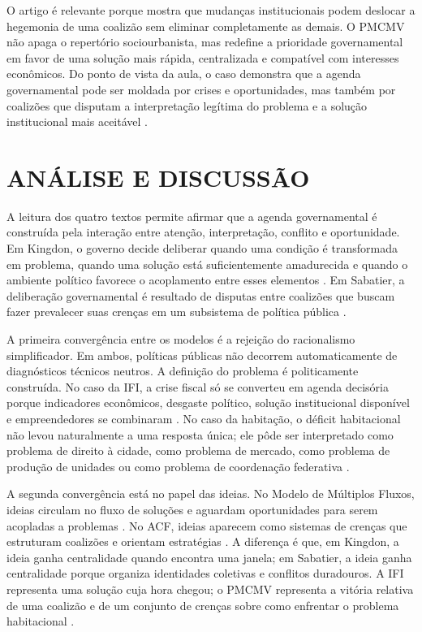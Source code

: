 \documentclass[12pt,a4paper]{article}
\begin{document}
O artigo é relevante porque mostra que mudanças institucionais podem deslocar a hegemonia de uma coalizão sem eliminar completamente as demais. O PMCMV não apaga o repertório sociourbanista, mas redefine a prioridade governamental em favor de uma solução mais rápida, centralizada e compatível com interesses econômicos. Do ponto de vista da aula, o caso demonstra que a agenda governamental pode ser moldada por crises e oportunidades, mas também por coalizões que disputam a interpretação legítima do problema e a solução institucional mais aceitável \autocites{sabatier1999theories}[][]{ferreira2019habitacional}.

\section{ANÁLISE E DISCUSSÃO}
\label{sec:org22e4352}
A leitura dos quatro textos permite afirmar que a agenda governamental é construída pela interação entre atenção, interpretação, conflito e oportunidade. Em Kingdon, o governo decide deliberar quando uma condição é transformada em problema, quando uma solução está suficientemente amadurecida e quando o ambiente político favorece o acoplamento entre esses elementos \autocites{kingdon2003agendas}[][]{capella2022multiplos}. Em Sabatier, a deliberação governamental é resultado de disputas entre coalizões que buscam fazer prevalecer suas crenças em um subsistema de política pública \autocites{sabatier1999theories}[][]{araujoSilva2022coalizoes}.

A primeira convergência entre os modelos é a rejeição do racionalismo simplificador. Em ambos, políticas públicas não decorrem automaticamente de diagnósticos técnicos neutros. A definição do problema é politicamente construída. No caso da IFI, a crise fiscal só se converteu em agenda decisória porque indicadores econômicos, desgaste político, solução institucional disponível e empreendedores se combinaram \autocite{bijos2024ifi}. No caso da habitação, o déficit habitacional não levou naturalmente a uma resposta única; ele pôde ser interpretado como problema de direito à cidade, como problema de mercado, como problema de produção de unidades ou como problema de coordenação federativa \autocite{ferreira2019habitacional}.

A segunda convergência está no papel das ideias. No Modelo de Múltiplos Fluxos, ideias circulam no fluxo de soluções e aguardam oportunidades para serem acopladas a problemas \autocite{kingdon2003agendas}. No ACF, ideias aparecem como sistemas de crenças que estruturam coalizões e orientam estratégias \autocite{sabatier1999theories}. A diferença é que, em Kingdon, a ideia ganha centralidade quando encontra uma janela; em Sabatier, a ideia ganha centralidade porque organiza identidades coletivas e conflitos duradouros. A IFI representa uma solução cuja hora chegou; o PMCMV representa a vitória relativa de uma coalizão e de um conjunto de crenças sobre como enfrentar o problema habitacional \autocites{bijos2024ifi}[][]{ferreira2019habitacional}.
\end{document}
